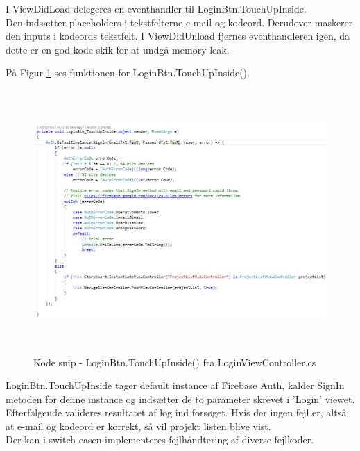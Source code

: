 \clearpage

I ViewDidLoad delegeres en eventhandler\cite{Event} til LoginBtn.TouchUpInside. \\
Den indsætter placeholders i tekstfelterne e-mail og kodeord. Derudover maskerer den inputs i kodeords tekstfelt.
I ViewDidUnload fjernes eventhandleren igen, da dette er en god kode skik for at undgå memory leak\cite{Memory}.

På Figur \ref{fig:LoginBtn} ses funktionen for LoginBtn.TouchUpInside().
\begin{figure}[H] %
	\centering
	\includegraphics[height=10cm, width=18cm]{../ArkitekturDesign/Design/Login/LoginBtn}
	\caption{Kode snip - LoginBtn.TouchUpInside() fra LoginViewController.cs}
	\label{fig:LoginBtn}
\end{figure}
LoginBtn.TouchUpInside tager default instance af Firebase Auth, kalder SignIn metoden for denne instance og indsætter de to parameter skrevet i 'Login' viewet. \\
Efterfølgende valideres resultatet af log ind forsøget. Hvis der ingen fejl er, altså at e-mail og kodeord er korrekt, så vil projekt listen blive vist. \\
Der kan i switch-casen implementeres fejlhåndtering af diverse fejlkoder. 


\clearpage